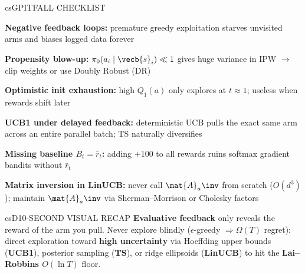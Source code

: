 \documentclass[../../../../master.tex]{subfiles}
\begin{document}
\begin{cscolumns}
\begin{cscard}{csG}{PITFALL CHECKLIST}
  \begin{csbul}
    \item \textbf{Negative feedback loops:} premature greedy exploitation starves unvisited arms and biases logged data forever
    \item \textbf{Propensity blow-up:} $\pi_0(a_i\mid\vecb{s}_i)\ll 1$ gives huge variance in IPW $\to$ clip weights or use Doubly Robust (DR)
    \item \textbf{Optimistic init exhaustion:} high $Q_1(a)$ only explores at $t\approx 1$; useless when rewards shift later
    \item \textbf{UCB1 under delayed feedback:} deterministic UCB pulls the exact same arm across an entire parallel batch; TS naturally diversifies
    \item \textbf{Missing baseline $B_t=\bar{r}_t$:} adding $+100$ to all rewards ruins softmax gradient bandits without $\bar{r}_t$
    \item \textbf{Matrix inversion in LinUCB:} never call $\mat{A}_a\inv$ from scratch ($O(d^3)$); maintain $\mat{A}_a\inv$ via Sherman--Morrison or Cholesky factors
  \end{csbul}
\end{cscard}

\begin{cscard}{csD}{10-SECOND VISUAL RECAP}
  \sffamily\footnotesize
  \textbf{Evaluative feedback} only reveals the reward of the arm you pull.
  Never explore blindly ($\epsilon$-greedy $\Rightarrow \Omega(T)$ regret): direct exploration toward \textbf{high uncertainty} via Hoeffding upper bounds (\textbf{UCB1}), posterior sampling (\textbf{TS}), or ridge ellipsoids (\textbf{LinUCB}) to hit the \textbf{Lai--Robbins $O(\ln T)$} floor.
\end{cscard}
\end{cscolumns}

\csend
\end{document}
